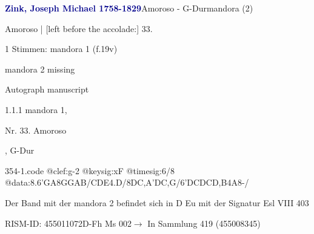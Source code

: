 \documentclass[twocolumn, 12pt]{book}
\begin{document}
\par \vspace{16pt} \textcolor{darkblue}{\textbf{Zink, Joseph Michael  1758-1829}}\hfillplus{\textbf{[354]}}\newline Amoroso - G-Dur\newline mandora (2)
\par \begin{itshape}[f.19v, at left:] Amoroso | [left before the accolade:] 33.\end{itshape} 
\par \textcolor{darkblue}{}  1 Stimmen: mandora 1  (f.19v)\newline \begin{small} mandora 2 missing\end{small} \newline Autograph manuscript
\par 1.1.1  mandora 1, \begin{itshape}Nr. 33. Amoroso\end{itshape}, G-Dur  
\begin{filecontents*}{354-1.code}
@clef:g-2
@keysig:xF
@timesig:6/8
@data:{8.6'GA8G}{GAB}/{CDE}4.D/{8DC,A}{'DC,G}/{6'DCDCD,B}4A8-/
\end{filecontents*}
\newline %
\par Der Band mit der mandora 2 befindet sich in D Eu mit der Signatur Esl VIII 403
\par RISM-ID: 455011072\newline D-Fh  Ms 002\newline $\rightarrow$ In Sammlung 419 (455008345)
      
\end{document}
